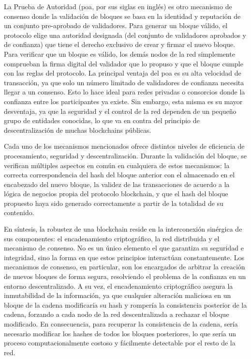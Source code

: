 La Prueba de Autoridad (\acrlong{poa}, por sus siglas en inglés) es otro mecanismo de consenso donde la validación de bloques se basa en la identidad y reputación de un conjunto pre-aprobado de validadores. Para generar un bloque válido, el protocolo elige una autoridad designada (del conjunto de validadores aprobados y de confianza) que tiene el derecho exclusivo de crear y firmar el nuevo bloque. Para verificar que un bloque es válido, los demás nodos de la red simplemente comprueban la firma digital del validador que lo propuso y que el bloque cumple con las reglas del protocolo. La principal ventaja del \acrshort{poa} es su alta velocidad de transacción, ya que solo un número limitado de validadores de confianza necesita llegar a un consenso. Esto lo hace ideal para redes privadas o consorcios donde la confianza entre los participantes ya existe. Sin embargo, esta misma es su mayor desventaja, ya que la seguridad y el control de la red dependen de un pequeño grupo de entidades conocidas, lo que va en contra del principio de descentralización de muchas blockchains públicas.

Cada uno de los mecanismos mencionados ofrece distintos niveles de eficiencia de procesamiento, seguridad y descentralización. Durante la validación del bloque, se verifican múltiples aspectos en común en cualquiera de estos mecanismos: la correcta correspondencia del hash del bloque anterior con el almacenado en el encabezado del nuevo bloque, la validez de las transacciones de acuerdo a la lógica de negocios propia del protocolo blockchain, y que el hash del bloque propuesto haya sido generado correctamente a partir de la totalidad de su contenido.

En síntesis, la robustez de una blockchain reside en la interconexión sinérgica de sus componentes: el encadenamiento criptográfico, la red distribuida y el mecanismo de consenso. No es un único elemento el que garantiza su seguridad e integridad, sino la forma en que estos principios interactúan constantemente. Los mecanismos de consenso, en particular, son los encargados de arbitrar la creación de nuevos bloques de forma segura, resolviendo el problema de la confianza en un entorno descentralizado. A su vez, el encadenamiento criptográfico asegura la inmutabilidad de la información, ya que cualquier alteración maliciosa en un bloque de la cadena modificaría su hash y rompería la consistencia posterior de la cadena, forzando a cada nodo de la red descentralizada a rechazar el bloque modificado. En consecuencia, para recuperar la consistencia de la cadena, sería necesario modificar los hashes de todos los bloques posteriores, lo que sería un proceso computacionalmente costoso y fácilmente detectable por el resto de la red. 

